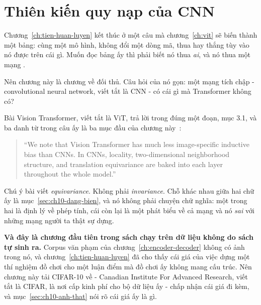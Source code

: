 \chapter{Thiên kiến quy nạp của CNN}
\label{ch:bias-quy-nap}

Chương~\ref{ch:tien-huan-luyen} kết thúc ở một câu mà chương~\ref{ch:vit} sẽ
biến thành một bảng: cùng một mô hình, không đổi một dòng mã, thua hay thắng
tùy vào nó được  trên cái gì. Muốn đọc bảng ấy
thì phải biết nó
thua \emph{ai}, và nó thua một mạng .

Nên chương này là chương về đối thủ. Câu hỏi của nó gọn: một mạng tích chập -
convolutional neural network, viết tắt là CNN - có cái gì mà Transformer không
có?

Bài Vision Transformer, viết tắt là ViT, trả lời trong đúng một đoạn, mục 3.1,
và ba danh từ trong câu ấy là ba mục đầu của chương
này~\autocite{dosovitskiy2021vit}:

\begin{quote}
\enquote{We note that Vision Transformer has much less image-specific inductive
bias than CNNs. In CNNs, locality, two-dimensional neighborhood structure, and
translation equivariance are baked into each layer throughout the whole model.}
\end{quote}

Chú ý bài viết \emph{equivariance}. Không phải \emph{invariance}. Chỗ khác nhau
giữa hai chữ ấy là mục~\ref{sec:ch10-dang-bien}, và nó không phải chuyện chữ
nghĩa: một trong hai là định lý về phép tính, cái còn lại là một phát biểu về
cả mạng và nó \emph{sai} với những mạng người ta thật sự dựng.

\textbf{Và đây là chương đầu tiên trong sách chạy trên dữ liệu không do sách tự
sinh ra.} Corpus văn phạm của chương~\ref{ch:encoder-decoder} không có ảnh
trong nó, và chương~\ref{ch:tien-huan-luyen} đã cho thấy cái giá của việc dựng
một thí nghiệm đồ chơi cho một luận điểm mà đồ chơi ấy không mang cấu trúc.
Nên chương này tải CIFAR-10 về - Canadian Institute For Advanced Research, viết
tắt là CIFAR, là nơi cấp kinh phí cho bộ dữ liệu ấy - chấp nhận cái giá đi kèm,
và mục~\ref{sec:ch10-anh-that} nói rõ cái giá ấy là gì.

